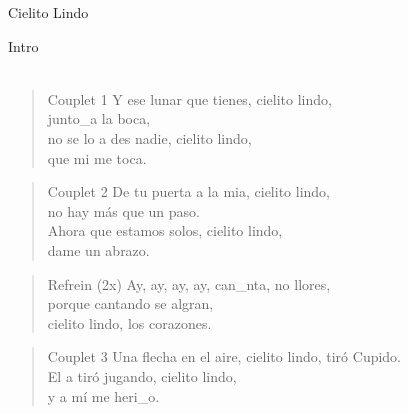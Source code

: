 \begin{song}[copla]{Cielito Lindo}
\begin{instrumental}{Intro}
\measure{}\measure{;}\measure{;}\measure{;}\measure{;}\measure*{;}\\
\measure{;}\measure{;}\measure{;}\measure{;}\measure{;}\measure{;}\measure*{;}\\\measure{;}\measure*{;}
\end{instrumental}
\begin{verse}{Couplet 1}
Y ese lunar que tienes, cielito lindo,\\
junto\_a la boca,\hspace{5em}\\
\chord{}no se lo a des nadie, cielito lindo,\\
que mi me toca.\\
\end{verse}
\begin{verse}{Couplet 2}
De tu puerta a la mia, cielito lindo,\\
no hay más que un paso.\\
\chord{}Ahora que estamos solos, cielito lindo,\\
dame un abrazo.\\
\end{verse}
\begin{verse}{Refrein (2x)}
Ay, ay, ay, ay,\hspace{1em}\hspace{1em} can\_nta, no llores,\\
porque cantando se algran,\\
cielito lindo, los corazones.\\
\end{verse}
\begin{verse}{Couplet 3}
Una flecha en el aire, cielito lindo,
tiró Cupido.\\
\chord{}El a tiró jugando, cielito lindo,\\
y a mí me heri\_o.\\
\end{verse}

\end{song}
